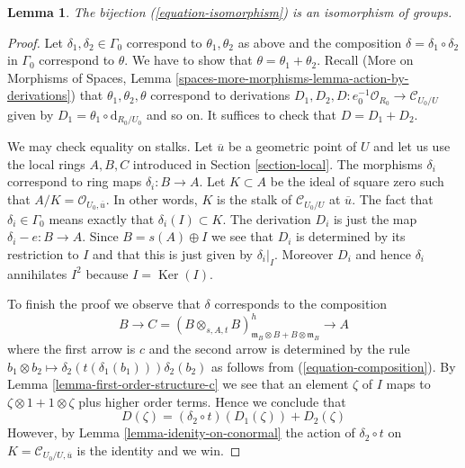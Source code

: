 \documentclass{stacks-project}
\theoremstyle{plain}
\newtheorem{lemma}[subsection]{Lemma}
\theoremstyle{definition}
\theoremstyle{remark}
\numberwithin{equation}{subsection}
\def\Ker{\mathop{\mathrm{Ker}}}
\begin{document}
\begin{lemma}
\label{lemma-composition-is-addition}
The bijection (\ref{equation-isomorphism}) is an isomorphism
of groups.
\end{lemma}

\begin{proof}
Let $\delta_1, \delta_2 \in \Gamma_0$ correspond to $\theta_1, \theta_2$
as above and the composition $\delta = \delta_1 \circ \delta_2$
in $\Gamma_0$ correspond to $\theta$. We have to show that
$\theta = \theta_1 + \theta_2$. Recall
(More on Morphisms of Spaces, Lemma
\ref{spaces-more-morphisms-lemma-action-by-derivations})
that $\theta_1, \theta_2, \theta$ correspond to derivations
$D_1, D_2, D : e_0^{-1}\mathcal{O}_{R_0} \to \mathcal{C}_{U_0/U}$
given by $D_1 = \theta_1 \circ \text{d}_{R_0/U_0}$ and so on.
It suffices to check that $D = D_1 + D_2$.

\medskip\noindent
We may check equality on stalks.
Let $\overline{u}$ be a geometric point of $U$ and let us use the local
rings $A, B, C$ introduced in Section \ref{section-local}.
The morphisms $\delta_i$ correspond to ring
maps $\delta_i : B \to A$. Let $K \subset A$ be the ideal of
square zero such that $A/K = \mathcal{O}_{U_0, \overline{u}}$.
In other words, $K$ is the stalk of $\mathcal{C}_{U_0/U}$ at $\overline{u}$.
The fact that $\delta_i \in \Gamma_0$
means exactly that $\delta_i(I) \subset K$.
The derivation $D_i$ is just the map $\delta_i - e : B \to A$.
Since $B = s(A) \oplus I$ we see that $D_i$ is determined by
its restriction to $I$ and that this is just given by
$\delta_i|_I$. Moreover $D_i$ and hence $\delta_i$ annihilates $I^2$
because $I = \Ker(I)$.

\medskip\noindent
To finish the proof we observe that $\delta$ corresponds to the
composition
$$
B \to C =
(B \otimes_{s, A, t} B)^h_{\mathfrak m_B \otimes B + B \otimes \mathfrak m_B}
\to A
$$
where the first arrow is $c$ and the second arrow is determined
by the rule
$b_1 \otimes b_2 \mapsto \delta_2(t(\delta_1(b_1))) \delta_2(b_2)$
as follows from (\ref{equation-composition}).
By Lemma \ref{lemma-first-order-structure-c}
we see that an element $\zeta$ of $I$ maps to
$\zeta \otimes 1 + 1 \otimes \zeta$ plus higher order terms.
Hence we conclude that
$$
D(\zeta) = (\delta_2 \circ t)\left(D_1(\zeta)\right) + D_2(\zeta)
$$
However, by Lemma \ref{lemma-idenity-on-conormal}
the action of $\delta_2 \circ t$ on
$K = \mathcal{C}_{U_0/U, \overline{u}}$ is the identity and
we win.
\end{proof}
\end{document}
